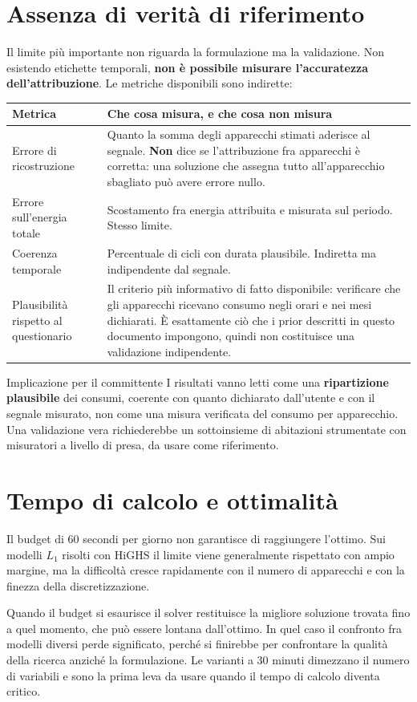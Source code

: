 \section{Assenza di verità di riferimento}

Il limite più importante non riguarda la formulazione ma la validazione. Non esistendo etichette
temporali, \textbf{non è possibile misurare l'accuratezza dell'attribuzione}. Le metriche
disponibili sono indirette:

\begin{center}
\begin{tabularx}{\textwidth}{@{}l X@{}}
\toprule
\textbf{Metrica} & \textbf{Che cosa misura, e che cosa non misura} \\
\midrule
Errore di ricostruzione
& Quanto la somma degli apparecchi stimati aderisce al segnale. \textbf{Non} dice se
  l'attribuzione fra apparecchi è corretta: una soluzione che assegna tutto all'apparecchio
  sbagliato può avere errore nullo. \\
\addlinespace
Errore sull'energia totale
& Scostamento fra energia attribuita e misurata sul periodo. Stesso limite. \\
\addlinespace
Coerenza temporale
& Percentuale di cicli con durata plausibile. Indiretta ma indipendente dal segnale. \\
\addlinespace
Plausibilità rispetto al questionario
& Il criterio più informativo di fatto disponibile: verificare che gli apparecchi ricevano
  consumo negli orari e nei mesi dichiarati. È esattamente ciò che i prior descritti in questo
  documento impongono, quindi non costituisce una validazione indipendente. \\
\bottomrule
\end{tabularx}
\end{center}

\begin{warnbox}{Implicazione per il committente}
I risultati vanno letti come una \textbf{ripartizione plausibile} dei consumi, coerente con quanto
dichiarato dall'utente e con il segnale misurato, non come una misura verificata del consumo per
apparecchio. Una validazione vera richiederebbe un sottoinsieme di abitazioni strumentate con
misuratori a livello di presa, da usare come riferimento.
\end{warnbox}

\section{Tempo di calcolo e ottimalità}

Il budget di 60 secondi per giorno non garantisce di raggiungere l'ottimo. Sui modelli $L_1$
risolti con HiGHS il limite viene generalmente rispettato con ampio margine, ma la difficoltà
cresce rapidamente con il numero di apparecchi e con la finezza della discretizzazione.

Quando il budget si esaurisce il solver restituisce la migliore soluzione trovata fino a quel
momento, che può essere lontana dall'ottimo. In quel caso il confronto fra modelli diversi perde
significato, perché si finirebbe per confrontare la qualità della ricerca anziché la formulazione.
Le varianti a 30 minuti dimezzano il numero di variabili e sono la prima leva da usare quando il
tempo di calcolo diventa critico.

